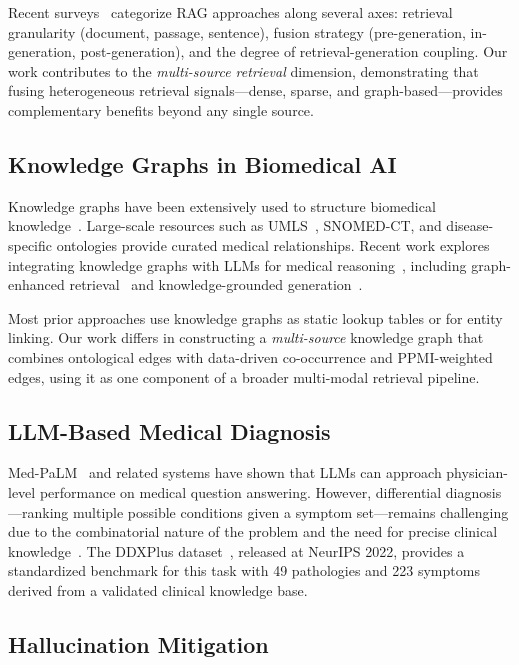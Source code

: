\documentclass[review]{elsarticle}
\begin{document}
Recent surveys~\cite{gao2023retrieval,zhao2024retrieval} categorize RAG approaches along several axes: retrieval granularity (document, passage, sentence), fusion strategy (pre-generation, in-generation, post-generation), and the degree of retrieval-generation coupling. Our work contributes to the \emph{multi-source retrieval} dimension, demonstrating that fusing heterogeneous retrieval signals---dense, sparse, and graph-based---provides complementary benefits beyond any single source.

\subsection{Knowledge Graphs in Biomedical AI}

Knowledge graphs have been extensively used to structure biomedical knowledge~\cite{santos2022knowledge,chandak2023building}. Large-scale resources such as UMLS~\cite{bodenreider2004unified}, SNOMED-CT, and disease-specific ontologies provide curated medical relationships. Recent work explores integrating knowledge graphs with LLMs for medical reasoning~\cite{pan2024unifying}, including graph-enhanced retrieval~\cite{he2024gretriever} and knowledge-grounded generation~\cite{yasunaga2022deep}.

Most prior approaches use knowledge graphs as static lookup tables or for entity linking. Our work differs in constructing a \emph{multi-source} knowledge graph that combines ontological edges with data-driven co-occurrence and PPMI-weighted edges, using it as one component of a broader multi-modal retrieval pipeline.

\subsection{LLM-Based Medical Diagnosis}

Med-PaLM~\cite{singhal2023large} and related systems have shown that LLMs can approach physician-level performance on medical question answering. However, differential diagnosis---ranking multiple possible conditions given a symptom set---remains challenging due to the combinatorial nature of the problem and the need for precise clinical knowledge~\cite{mcduff2023towards}. The DDXPlus dataset~\cite{fansi2022ddxplus}, released at NeurIPS 2022, provides a standardized benchmark for this task with 49 pathologies and 223 symptoms derived from a validated clinical knowledge base.

\subsection{Hallucination Mitigation}
\end{document}
